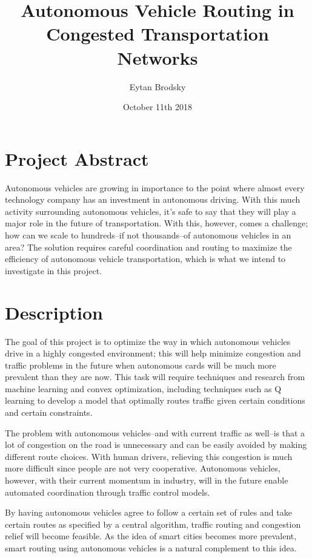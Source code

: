 \documentclass[letterpaper, 10 pt, conference, draftclsnofoot, onecolumn]{ieeeconf}
\title{Autonomous Vehicle Routing in Congested Transportation Networks}
\author{Eytan Brodsky }
\date{October 11th 2018}
\begin{document}
\maketitle
\section{Project Abstract}

    Autonomous vehicles are growing in importance to the point where almost every technology company has an investment in autonomous driving. With this much activity surrounding autonomous vehicles, it's safe to say that they will play a major role in the future of transportation. With this, however, comes a challenge; how can we scale to hundreds--if not thousands--of autonomous vehicles in an area? The solution requires careful coordination and routing to maximize the efficiency of autonomous vehicle transportation, which is what we intend to investigate in this project.
    
\maketitle
\section{Description}
    The goal of this project is to optimize the way in which autonomous vehicles drive in a highly congested environment; this will help minimize congestion and traffic problems in the future when autonomous cards will be much more prevalent than they are now. This task will require techniques and research from machine learning and convex optimization, including techniques such as Q learning to develop a model that optimally routes traffic given certain conditions and certain constraints.
    
    The problem with autonomous vehicles--and with current traffic as well--is that a lot of congestion on the road is unnecessary and can be easily avoided by making different route choices. With human drivers, relieving this congestion is much more difficult since people are not very cooperative. Autonomous vehicles, however, with their current momentum in industry, will in the future enable automated coordination through traffic control models.
    
    By having autonomous vehicles agree to follow a certain set of rules and take certain routes as specified by a central algorithm, traffic routing and congestion relief will become feasible. As the idea of smart cities becomes more prevalent, smart routing using autonomous vehicles is a natural complement to this idea.
    
\end{document}
